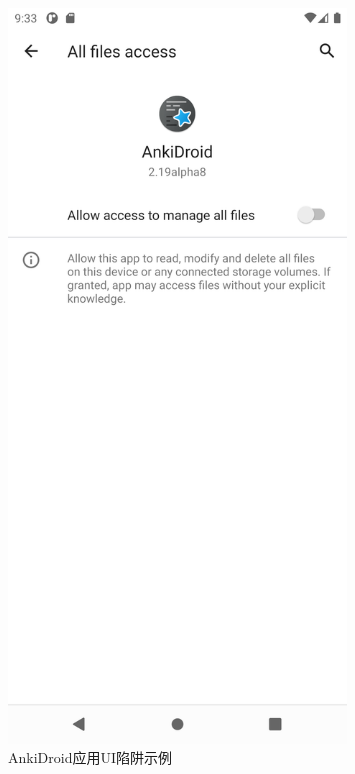 \documentclass{article}
\begin{document}
\begin{figure}[h]
\begin{minipage}
            \caption{Omninotes应用UI陷阱示例}
            \label{fig:ui_trap_example1}
        \end{minipage}
    \hfill
    \begin{minipage}
        [t]{0.4\textwidth}
            \centering
            \includegraphics[width=0.8\textwidth]{2.png}
            \caption{AnkiDroid应用UI陷阱示例}
            \label{fig:ui_trap_example2}
        \end{minipage}
\end{figure}
\end{document}
